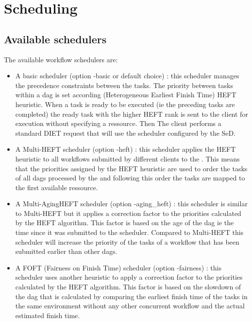 \section{Scheduling}

\label{sec:wf_sched}

\subsection{Available schedulers}

The available \madag workflow schedulers are:

\begin{itemize}

\item A basic scheduler (option -basic or default choice) :
this scheduler manages the precedence constraints between the tasks. The
 priority between tasks within a dag is set according (Heterogeneous 
Earliest Finish Time) HEFT~\cite{heft_cpop} heuristic. When a task is ready to be
executed (ie the preceding tasks are completed) the ready task with the higher
HEFT rank is sent to the client for execution without specifying a ressource. 
Then The client performs a standard DIET request that will use the scheduler
configured by the SeD.

\item A Multi-HEFT scheduler (option -heft) : this scheduler applies
the HEFT heuristic to all workflows submitted by different clients to
the \madag. This means that the priorities assigned by the HEFT
heuristic are used to order the tasks of all dags processed by the
\madag and following this order the tasks are mapped to the first
available ressource.

\item A Multi-AgingHEFT scheduler (option -aging\_heft) : this scheduler
is similar to Multi-HEFT but it applies a correction factor to the
priorities calculated by the HEFT algorithm. This factor is based on
the age of the dag ie the time since it was submitted to the scheduler.
Compared to Multi-HEFT this scheduler will increase the priority of the
tasks of a workflow that has been submitted earlier than other dags.

\item A FOFT (Fairness on Finish Time) scheduler (option -fairness) :
this scheduler uses another heuristic to apply a correction factor to
the priorities calculated by the HEFT algorithm. This factor is based
on the slowdown of the dag that is calculated by comparing the earliest
finish time of the tasks in the same environment without any other
concurrent workflow and the actual estimated finish time.

\end{itemize}

